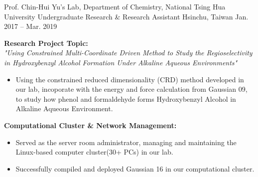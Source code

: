 \begin{cventries}
\cventry
{Prof. Chin-Hui Yu's Lab, Department of Chemistry, National Tsing Hua University} %
{Undergraduate Research \& Research Assistant}
{Hsinchu, Taiwan} %
{Jan. 2017 -- Mar. 2019}
{
\textbf{Research Project Topic:}\\
\textit{"Using Constrained Multi-Coordinate Driven Method to Study the Regioselectivity in Hydroxybenzyl Alcohol Formation Under Alkaline Aqueous Environments"}
\begin{itemize}
    \item Using the constrained reduced dimensionality (CRD) method developed in our lab, incoporate with the energy and force calculation from Gaussian 09, to study how phenol and formaldehyde forms Hydroxybenzyl Alcohol in Alkaline Aqueous Environment. 
\end{itemize}
\textbf{Computational Cluster \& Network Management:}
\begin{itemize}
    \item Served as the server room administrator, managing and maintaining the Linux-based computer cluster(30+ PCs) in our lab.
    \item Successfully compiled and deployed Gaussian 16 in our computational cluster.
\end{itemize}
}



\end{cventries}
